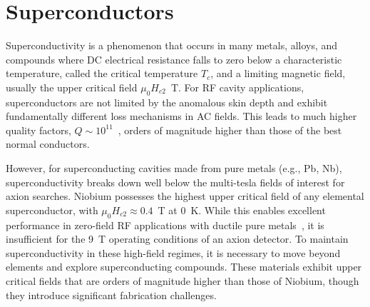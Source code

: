 \section{Superconductors}\label{sec:superconductor}

    Superconductivity is a phenomenon that occurs in many metals, alloys, and compounds where DC electrical resistance falls to zero below a characteristic temperature, called the critical temperature $T_c$, and a limiting magnetic field, usually the upper critical field $\mu_0 H_{c2}$~T. For RF cavity applications, superconductors are not limited by the anomalous skin depth and exhibit fundamentally different loss mechanisms in AC fields. This leads to much higher quality factors, $Q\sim10^{11}$~\cite{bafiaSignaturesEnhancedSuperconducting2025}, orders of magnitude higher than those of the best normal conductors. 
    
    However, for superconducting cavities made from pure metals (e.g., Pb, Nb), superconductivity breaks down well below the multi-tesla fields of interest for axion searches. Niobium possesses the highest upper critical field of any elemental superconductor, with $\mu_0 H_{c2} \approx 0.4$~T at 0~K. While this enables excellent performance in zero-field RF applications with ductile pure metals~\cite{padamseeRFSuperconductivity2009}, it is insufficient for the 9~T operating conditions of an axion detector. To maintain superconductivity in these high-field regimes, it is necessary to move beyond elements and explore superconducting compounds. These materials exhibit upper critical fields that are orders of magnitude higher than those of Niobium, though they introduce significant fabrication challenges.

    

